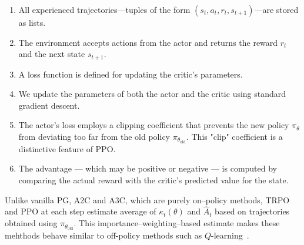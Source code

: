 \documentclass{article}
\numberwithin{equation}{section}
\begin{document}
\begin{enumerate}
  \item All experienced trajectories—tuples of the form $(s_t, a_t, r_t, s_{t+1})$—are stored as lists.
  \item The environment accepts actions from the actor and returns the reward {$r_{t}$} and the next state $s_{t+1}$.
  \item A loss function is defined for updating the critic's parameters.
  \item We update the parameters of both the actor and the critic using standard gradient descent.
  \item The actor's loss employs a clipping coefficient that prevents the new policy $\pi_{\theta}$ from deviating too far from the old policy $\pi_{\theta_{\text{old}}}$.  This "clip" coefficient is a distinctive feature of PPO.
  \item The advantage --- which may be positive or negative --- is computed by comparing the actual reward with the critic's predicted value for the state.
\end{enumerate}
Unlike vanilla PG, A2C and A3C, which are purely on--policy methods, TRPO and PPO at each step estimate average of {$\kappa_t(\theta)$} and $\hat A_t$ based on trajectories obtained using $\pi_{\theta_{\mathrm{old}}}$. This importance--weighting--based estimate makes these mehthods behave similar to off-policy methods such as $Q$-learning~\cite{mambelli2024off}.
\end{document}
